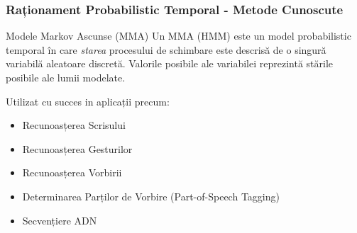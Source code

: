 \begin{frame}[t]
    \frametitle{Raționament Probabilistic Temporal - Metode Cunoscute}
  
  \begin{block}{Modele Markov Ascunse (MMA)}
	Un MMA (HMM) este un model probabilistic temporal în care \emph{starea} procesului de schimbare este descrisă
	de \alert{o singură variabilă aleatoare discretă}.
	Valorile posibile ale variabilei reprezintă stările posibile ale lumii modelate.
  \end{block}
  
  \vspace*{1em}
  
  Utilizat cu succes in aplicații precum:
  \begin{itemize}
  	\item Recunoasțerea Scrisului
  	\item Recunoasțerea Gesturilor
  	\item Recunoasțerea Vorbirii
  	\item Determinarea Parților de Vorbire (Part-of-Speech Tagging)
  	\item Secvențiere ADN
  \end{itemize}
\end{frame}

